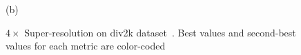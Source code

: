 \begin{figure}[ht]
\begin{minipage}[c]{.61\linewidth}
(b)
\end{minipage} \vspace{-.5em}
\caption{$4\times$ Super-resolution on div2k dataset~\citep{div2k}. \colorbox{red!15}{Best values} and \colorbox{blue!15}{second-best values} for each metric are color-coded} 
\label{tab:sisr_4x}
\end{figure}


